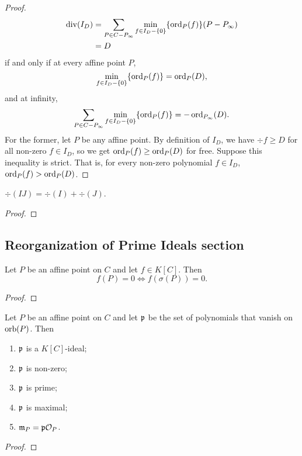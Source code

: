 \begin{proof}
  \begin{align*}
    \div(I_D)
      &= \sum_{P \in C - P_\infty} \min_{f \in I_D - \{0\}}\{\ord_P(f)\}(P - P_\infty) \\
      &= D
  \end{align*}
  if and only if at every affine point $P$,
  \[ \min_{f \in I_D - \{0\}}\{\ord_P(f)\} = \ord_P(D), \]
  and at infinity,
  \[ \sum_{P \in C - P_\infty} \min_{f \in I_D - \{0\}}\{\ord_P(f)\} = - \ord_{P_\infty}(D). \]
  For the former, let $P$ be any affine point.
  By definition of $I_D$, we have $\div f \geq D$ for all non-zero $f \in I_D$,
  so we get $\ord_P(f) \geq \ord_P(D)$ for free.
  Suppose this inequality is strict.
  That is, for every non-zero polynomial $f \in I_D$, $\ord_P(f) > \ord_P(D)$.
\end{proof}
\begin{lemma}
  $\div(IJ) = \div(I) + \div(J)$.
\end{lemma}
\begin{proof}
\end{proof}




\subsection{Reorganization of Prime Ideals section}

\begin{proposition}
  Let $P$ be an affine point on $C$ and let $f \in K[C]$. Then
  \[ f(P) = 0 \iff f(\sigma(P)) = 0. \]
\end{proposition}
\begin{proof}
\end{proof}

\begin{proposition}
  Let $P$ be an affine point on $C$ and let $\frak p$ be the set of polynomials that vanish on $\orb(P)$. Then
  \begin{enumerate}[label=(\roman*)]
    \item $\frak p$ is a $K[C]$-ideal;
    \item $\frak p$ is non-zero;
    \item $\frak p$ is prime;
    \item $\frak p$ is maximal;
    \item $\frak m_P = \frak p \cal O_P$.
  \end{enumerate}
\end{proposition}
\begin{proof}
\end{proof}

